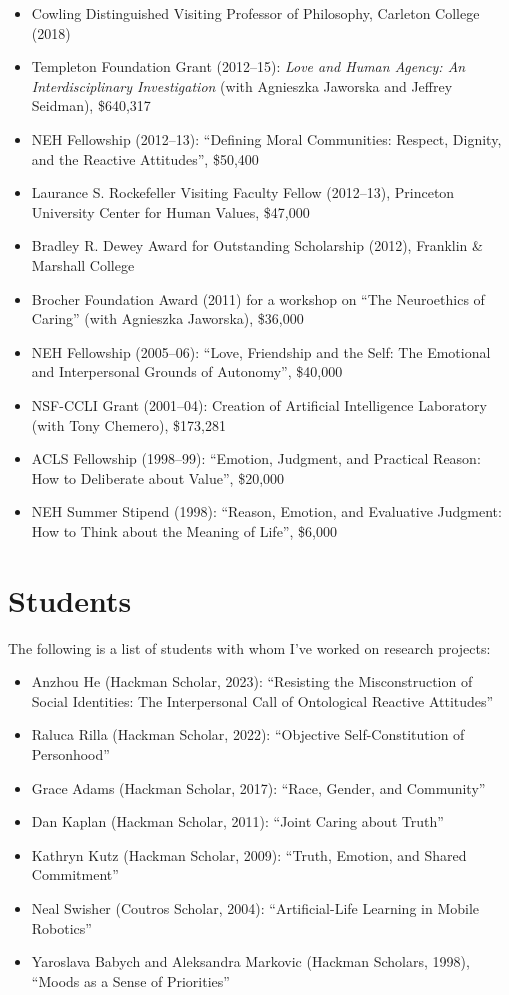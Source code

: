 \documentclass[%
  11pt,%
]{article}
\begin{document}
\begin{itemize}
  \item Cowling Distinguished Visiting Professor of Philosophy, Carleton College (2018)
  \item Templeton Foundation Grant (2012--15): \emph{Love and Human Agency: An Interdisciplinary Investigation} (with Agnieszka Jaworska and Jeffrey Seidman), \$640,317
  \item NEH Fellowship (2012--13): \enquote{Defining Moral Communities: Respect, Dignity, and the Reactive Attitudes}, \$50,400
  \item Laurance S. Rockefeller Visiting Faculty Fellow (2012--13), Princeton University Center for Human Values, \$47,000
  \item Bradley R. Dewey Award for Outstanding Scholarship (2012), Franklin \& Marshall College
  \item Brocher Foundation Award (2011) for a workshop on \enquote{The Neuroethics of Caring} (with Agnieszka Jaworska), \$36,000
  \item NEH Fellowship (2005--06): \enquote{Love, Friendship and the Self: The Emotional and Interpersonal Grounds of Autonomy}, \$40,000
  \item NSF-CCLI Grant (2001--04): Creation of Artificial Intelligence Laboratory (with Tony Chemero), \$173,281
  \item ACLS Fellowship (1998--99): \enquote{Emotion, Judgment, and Practical Reason: How to Deliberate about Value}, \$20,000
  \item NEH Summer Stipend (1998): \enquote{Reason, Emotion, and Evaluative Judgment: How to Think about the Meaning of Life}, \$6,000
\end{itemize}

\section{Students}

The following is a list of students with whom I've worked on research projects:
\begin{itemize}
  \item Anzhou He (Hackman Scholar, 2023): \enquote{Resisting the Misconstruction of Social Identities: The Interpersonal Call of Ontological Reactive Attitudes}
  \item Raluca Rilla (Hackman Scholar, 2022): \enquote{Objective Self-Constitution of Personhood}
  \item Grace Adams (Hackman Scholar, 2017): \enquote{Race, Gender, and Community}
  \item Dan Kaplan (Hackman Scholar, 2011): \enquote{Joint Caring about Truth}
  \item Kathryn Kutz (Hackman Scholar, 2009): \enquote{Truth, Emotion, and Shared Commitment}
  \item Neal Swisher (Coutros Scholar, 2004): \enquote{Artificial-Life Learning in Mobile Robotics}
  \item Yaroslava Babych and Aleksandra Markovic (Hackman Scholars, 1998), \enquote{Moods as a Sense of Priorities}
\end{itemize}
\end{document}
